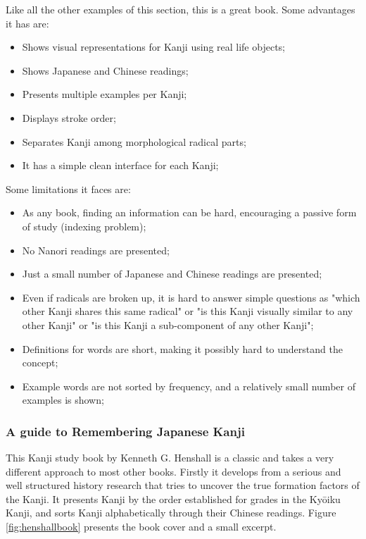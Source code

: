 Like all the other examples of this section, this is a great book. Some advantages it has are:
\begin{itemize}
    \item Shows visual representations for Kanji using real life objects;
    \item Shows Japanese and Chinese readings;
    \item Presents multiple examples per Kanji;
    \item Displays stroke order;
    \item Separates Kanji among morphological radical parts;
    \item It has a simple clean interface for each Kanji;
\end{itemize}

Some limitations it faces are:
\begin{itemize}
    \item As any book, finding an information can be hard, encouraging a passive form of study (indexing problem);
    \item No Nanori readings are presented;
    \item Just a small number of Japanese and Chinese readings are presented;
    \item Even if radicals are broken up, it is hard to answer simple questions as "which other Kanji shares this same radical" or "is this Kanji visually similar to any other Kanji" or "is this Kanji a sub-component of any other Kanji";
    \item Definitions for words are short, making it possibly hard to understand the concept;
    \item Example words are not sorted by frequency, and a relatively small number of examples is shown;
\end{itemize}

\subsubsection{A guide to Remembering Japanese Kanji}

This Kanji study book by Kenneth G. Henshall\cite{henshall1988guide} is a classic and takes a very different approach to most other books. Firstly it develops from a serious and well structured history research that tries to uncover the true formation factors of the Kanji. It presents Kanji by the order established for grades in the Ky\={o}iku Kanji, and sorts Kanji alphabetically through their Chinese readings. Figure \ref{fig:henshallbook} presents the book cover and a small excerpt.

